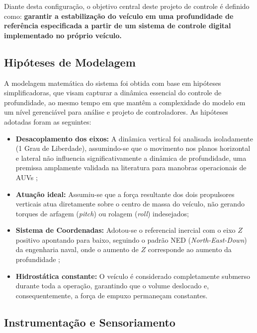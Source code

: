 \documentclass[12pt, a4paper]{article}
\begin{document}
		Diante desta configuração, o objetivo central deste projeto de controle é definido como: \textbf{garantir a estabilização do veículo em uma profundidade de referência especificada a partir de um sistema de controle digital implementado no próprio veículo.}

		\subsection{Hipóteses de Modelagem}

			A modelagem matemática do sistema foi obtida com base em hipóteses simplificadoras, que visam capturar a dinâmica essencial do controle de profundidade, ao mesmo tempo em que mantêm a complexidade do modelo em um nível gerenciável para análise e projeto de controladores. As hipóteses adotadas foram as seguintes:

			\begin{itemize}
				\item \textbf{Desacoplamento dos eixos:} A dinâmica vertical foi analisada isoladamente (1 Grau de Liberdade), assumindo-se que o movimento nos planos horizontal e lateral não influencia significativamente a dinâmica de profundidade, uma premissa amplamente validada na literatura para manobras operacionais de AUVs \cite{fossen,antonelli};

				\item \textbf{Atuação ideal:} Assumiu-se que a força resultante dos dois propulsores verticais atua diretamente sobre o centro de massa do veículo, não gerando torques de arfagem (\textit{pitch}) ou rolagem (\textit{roll}) indesejados;

				\item \textbf{Sistema de Coordenadas:} Adotou-se o referencial inercial com o eixo $Z$ positivo apontando para baixo, seguindo o padrão NED (\textit{North-East-Down}) da engenharia naval, onde o aumento de $Z$ corresponde ao aumento da profundidade \cite{fossen};

				\item \textbf{Hidrostática constante:} O veículo é considerado completamente submerso durante toda a operação, garantindo que o volume deslocado e, consequentemente, a força de empuxo permaneçam constantes.
			\end{itemize}

		\subsection{Instrumentação e Sensoriamento}
\end{document}
